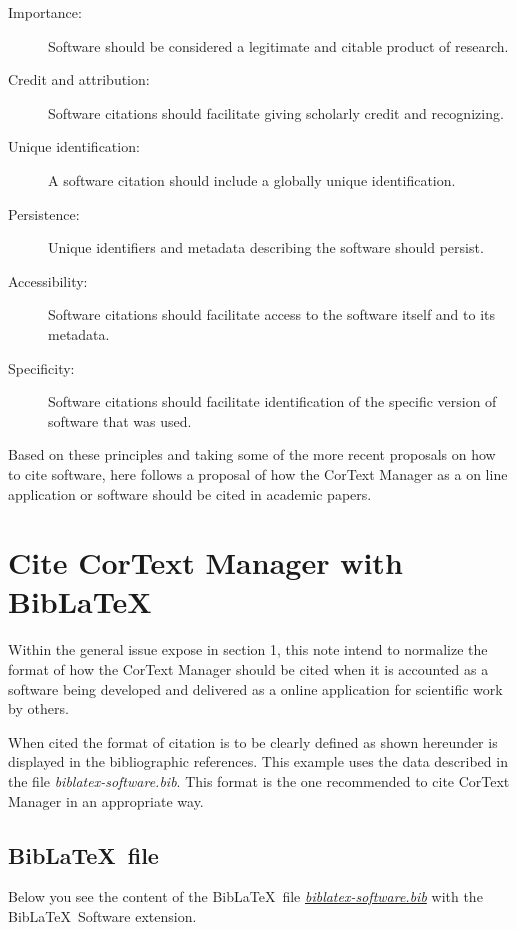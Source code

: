 \documentclass{article}
\begin{document}
\begin{description}
  \item[Importance:] Software should be considered a legitimate and citable product of research.
  \item[Credit and attribution:] Software citations should facilitate giving scholarly credit and recognizing.
  \item[Unique identification:] A software citation should include a globally unique identification.
  \item[Persistence:] Unique identifiers and metadata describing the software should persist.
  \item[Accessibility:] Software citations should facilitate access to the software itself and to its metadata.
  \item[Specificity:] Software citations should facilitate identification of the specific version of software that was used.
\end{description}

Based on these principles and taking some of the more recent proposals on how
to cite software, here follows a proposal of how the CorText Manager as a on
line application or software should be cited in academic papers.

\section{Cite CorText Manager with Bib\LaTeX} \label{example-biblatex}

Within the general issue expose in section 1, this note intend to normalize the
format of how the CorText Manager should be cited when it is accounted as a
software being developed and delivered as a online application for scientific
work by others.

When cited the format of citation is to be clearly defined as shown hereunder
\cite{cortext_manager_v2} is displayed in the bibliographic references. This
example uses the data described in the file {\em biblatex-software.bib}.  This
format is the one recommended to cite CorText Manager in an appropriate way.

\printbibliography[type=software,title={\small References to Software development (example)}]

\subsection{Bib\LaTeX \ file}

Below you see the content of the Bib\LaTeX \ file
\href{https://github.com/cortext/how-to-cite-cortext/blob/main/biblatex-software.bib}{\em biblatex-software.bib}
with the Bib\LaTeX \ Software extension\cite{softwareheritageorg_citing_2020}.
\end{document}
